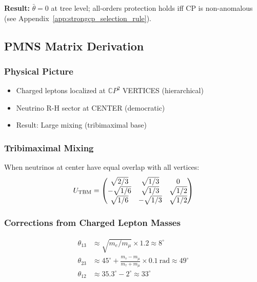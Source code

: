 \textbf{Result:} $\bar{\theta} = 0$ at tree level; all-orders protection holds iff CP is non-anomalous (see Appendix~\ref{app:strongcp_selection_rule}).

\subsection{PMNS Matrix Derivation}\label{app:pmns}

\subsubsection{Physical Picture}

\begin{itemize}
\item Charged leptons localized at $\mathbb{C}P^2$ VERTICES (hierarchical)
\item Neutrino R-H sector at CENTER (democratic)
\item Result: Large mixing (tribimaximal base)
\end{itemize}

\subsubsection{Tribimaximal Mixing}

When neutrinos at center have equal overlap with all vertices:
\begin{equation}
U_{\rm TBM} = \begin{pmatrix} 
\sqrt{2/3} & \sqrt{1/3} & 0 \\
-\sqrt{1/6} & \sqrt{1/3} & \sqrt{1/2} \\
\sqrt{1/6} & -\sqrt{1/3} & \sqrt{1/2}
\end{pmatrix}
\end{equation}

\subsubsection{Corrections from Charged Lepton Masses}

\begin{align}
\theta_{13} &\approx \sqrt{m_e/m_\mu} \times 1.2 \approx 8^\circ \\
\theta_{23} &\approx 45^\circ + \frac{m_\tau - m_\mu}{m_\tau + m_\mu} \times 0.1~\text{rad} \approx 49^\circ \\
\theta_{12} &\approx 35.3^\circ - 2^\circ \approx 33^\circ
\end{align}

